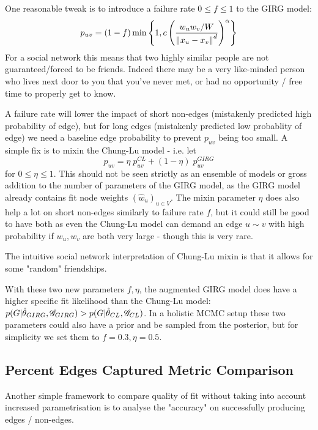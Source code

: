 One reasonable tweak is to introduce a failure rate $0 \leq f \leq 1$ to the GIRG model: 
\begin{equation}
  p_{uv} = (1 - f) \min \left \{ 
    1,
    c \left (
        \frac{w_u w_v / W}{\left\lVert x_u - x_v\right\rVert^d}
    \right )^\alpha    
\right \}
\end{equation}
For a social network this means that two highly similar people are not guaranteed/forced to be friends. Indeed there may be a very like-minded person who lives next door to you that you've never met, or had no opportunity / free time to properly get to know.

A failure rate will lower the impact of short non-edges (mistakenly predicted high probability of edge), but for long edges (mistakenly predicted low probablity of edge) we need a baseline edge probability to prevent $p_{uv}$ being too small. A simple fix is to mixin the Chung-Lu model - i.e. let 
\begin{equation}
  p_{uv} = \eta \; p_{uv}^{CL} + (1 - \eta) \; p_{uv}^{GIRG}
\end{equation}
for $0 \leq \eta \leq 1$. This should not be seen strictly as an ensemble of models or gross addition to the number of parameters of the GIRG model, as the GIRG model already contains fit node weights $(\hat{w}_u)_{u \in V}$. The mixin parameter $\eta$ does also help a lot on short non-edges similarly to failure rate $f$, but it could still be good to have both as even the Chung-Lu model can demand an edge $u \sim v$ with high probability if $w_u, w_v$ are both very large - though this is very rare.

The intuitive social network interpretation of Chung-Lu mixin is that it allows for some "random" friendships.


With these two new parameters $f, \eta$, the augmented GIRG model does have a higher specific fit likelihood than the Chung-Lu model: $p(G | \hat{\theta}_{GIRG}, \mathscr{G}_{GIRG}) > p(G | \hat{\theta}_{CL}, \mathscr{G}_{CL})$. In a holistic MCMC setup these two parameters could also have a prior and be sampled from the posterior, but for simplicity we set them to $f=0.3, \eta=0.5$.


\subsection{Percent Edges Captured Metric Comparison}
Another simple framework to compare quality of fit without taking into account increased parametrisation is to analyse the "accuracy" on successfully producing edges / non-edges.

